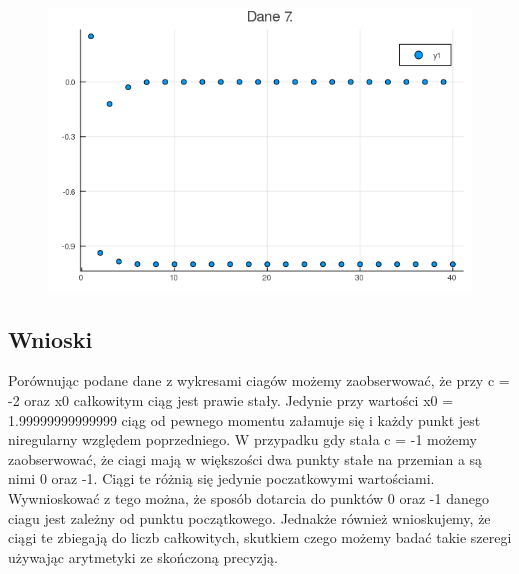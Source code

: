 \documentclass[11pt, a4paper]{article}
\begin{document}
\begin{figure}[H]
\begin{minipage}{0.4\textwidth}
  \end{minipage}
  \begin{minipage}{0.4\textwidth}
    \centering
    \includegraphics[width=\linewidth]{plot7}
  \end{minipage}
\end{figure}

\subsection{Wnioski}
Porównując podane dane z wykresami ciagów możemy zaobserwować, że przy c = -2 oraz x0 całkowitym ciąg jest prawie stały. Jedynie przy wartości x0 = 1.99999999999999 ciąg od pewnego momentu załamuje się i każdy punkt jest niregularny względem poprzedniego. W przypadku gdy stała c = -1 możemy zaobserwować, że ciagi mają w większości dwa punkty stałe na przemian a są nimi 0 oraz -1. Ciągi te różnią się jedynie poczatkowymi wartościami. Wywnioskować z tego można, że sposób dotarcia do punktów 0 oraz -1 danego ciagu jest zależny od punktu początkowego. Jednakże również wnioskujemy, że ciągi te zbiegają do liczb całkowitych, skutkiem czego możemy badać takie szeregi używając arytmetyki ze skończoną precyzją.
\end{document}
